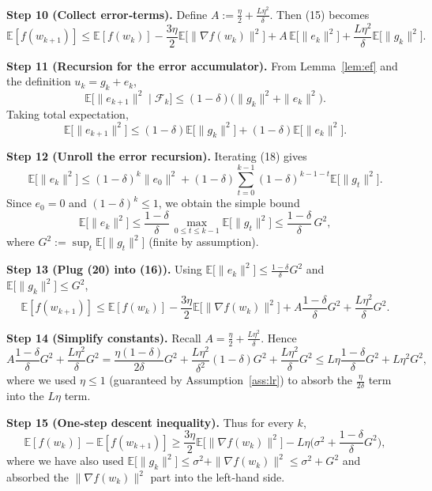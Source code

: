 \documentclass{article}
\newcommand{\E}{\mathbb{E}}
\begin{document}
\noindent\textbf{Step 10 (Collect error‑terms).}
Define $A:=\frac{\eta}{2}+\frac{L\eta^{2}}{\delta}$. Then (15) becomes
\[
\E[f(w_{k+1})]\le \E[f(w_{k})]
   -\frac{3\eta}{2}\E\!\big[\|\nabla f(w_{k})\|^{2}\big]
   +A\,\E\!\big[\|e_{k}\|^{2}\big]
   +\frac{L\eta^{2}}{\delta}\E\!\big[\|g_{k}\|^{2}\big].
\tag{16}
\]

\noindent\textbf{Step 11 (Recursion for the error accumulator).}
From Lemma~\ref{lem:ef} and the definition $u_{k}=g_{k}+e_{k}$,
\[
\E\!\big[\|e_{k+1}\|^{2}\mid\mathcal{F}_{k}\big]
\le (1-\delta)\big(\|g_{k}\|^{2}+\|e_{k}\|^{2}\big).
\tag{17}
\]
Taking total expectation,
\[
\E\!\big[\|e_{k+1}\|^{2}\big]\le (1-\delta)\E\!\big[\|g_{k}\|^{2}\big]
                                 +(1-\delta)\E\!\big[\|e_{k}\|^{2}\big].
\tag{18}
\]

\noindent\textbf{Step 12 (Unroll the error recursion).}
Iterating (18) gives
\[
\E\!\big[\|e_{k}\|^{2}\big]\le (1-\delta)^{k}\|e_{0}\|^{2}
   + (1-\delta)\sum_{t=0}^{k-1}(1-\delta)^{k-1-t}\E\!\big[\|g_{t}\|^{2}\big].
\tag{19}
\]
Since $e_{0}=0$ and $(1-\delta)^{k}\le1$, we obtain the simple bound
\[
\E\!\big[\|e_{k}\|^{2}\big]\le \frac{1-\delta}{\delta}\,\max_{0\le t\le k-1}\E\!\big[\|g_{t}\|^{2}\big]
\le \frac{1-\delta}{\delta}\,G^{2},
\tag{20}
\]
where $G^{2}:=\sup_{t}\E\!\big[\|g_{t}\|^{2}\big]$ (finite by assumption).

\noindent\textbf{Step 13 (Plug (20) into (16)).}
Using $\E\!\big[\|e_{k}\|^{2}\big]\le \frac{1-\delta}{\delta}G^{2}$ and $\E\!\big[\|g_{k}\|^{2}\big]\le G^{2}$,
\[
\E[f(w_{k+1})]\le \E[f(w_{k})]
   -\frac{3\eta}{2}\E\!\big[\|\nabla f(w_{k})\|^{2}\big]
   +A\frac{1-\delta}{\delta}G^{2}
   +\frac{L\eta^{2}}{\delta}G^{2}.
\tag{21}
\]

\noindent\textbf{Step 14 (Simplify constants).}
Recall $A=\frac{\eta}{2}+\frac{L\eta^{2}}{\delta}$. Hence
\[
A\frac{1-\delta}{\delta}G^{2}
   +\frac{L\eta^{2}}{\delta}G^{2}
= \frac{\eta(1-\delta)}{2\delta}G^{2}
  +\frac{L\eta^{2}}{\delta^{2}}(1-\delta)G^{2}
  +\frac{L\eta^{2}}{\delta}G^{2}
\le L\eta\frac{1-\delta}{\delta}G^{2}+L\eta^{2}G^{2},
\tag{22}
\]
where we used $\eta\le 1$ (guaranteed by Assumption~\ref{ass:lr}) to absorb the $\frac{\eta}{2\delta}$ term into the $L\eta$ term.

\noindent\textbf{Step 15 (One‑step descent inequality).}
Thus for every $k$,
\[
\E[f(w_{k})]-\E[f(w_{k+1})]
\ge \frac{3\eta}{2}\E\!\big[\|\nabla f(w_{k})\|^{2}\big]
      -L\eta\Big(\sigma^{2}+\frac{1-\delta}{\delta}G^{2}\Big),
\tag{23}
\]
where we have also used $\E\!\big[\|g_{k}\|^{2}\big]\le\sigma^{2}+ \|\nabla f(w_{k})\|^{2}\le\sigma^{2}+G^{2}$ and absorbed the $\|\nabla f(w_{k})\|^{2}$ part into the left‑hand side.
\end{document}
